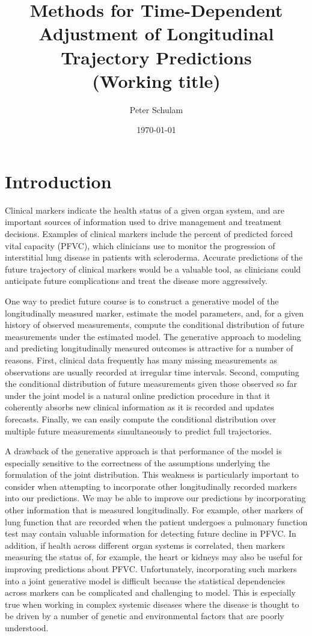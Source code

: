 \documentclass[12pt]{article}
\title{Methods for Time-Dependent Adjustment of Longitudinal Trajectory Predictions\\(Working title)}
\author{Peter Schulam}
\date{\today}
\begin{document}
\maketitle

\section{Introduction}

Clinical markers indicate the health status of a given organ system, and are important sources of information used to drive management and treatment decisions. Examples of clinical markers include the percent of predicted forced vital capacity (PFVC), which clinicians use to monitor the progression of interstitial lung disease in patients with scleroderma. Accurate predictions of the future trajectory of clinical markers would be a valuable tool, as clinicians could anticipate future complications and treat the disease more aggressively.

One way to predict future course is to construct a generative model of the longitudinally measured marker, estimate the model parameters, and, for a given history of observed measurements, compute the conditional distribution of future measurements under the estimated model. The generative approach to modeling and predicting longitudinally measured outcomes is attractive for a number of reasons. First, clinical data frequently has many missing measurements as observations are usually recorded at irregular time intervals. Second, computing the conditional distribution of future measurements given those observed so far under the joint model is a natural online prediction procedure in that it coherently absorbs new clinical information as it is recorded and updates forecasts. Finally, we can easily compute the conditional distribution over multiple future measurements simultaneously to predict full trajectories.

A drawback of the generative approach is that performance of the model is especially sensitive to the correctness of the assumptions underlying the formulation of the joint distribution. This weakness is particularly important to consider when attempting to incorporate other longitudinally recorded markers into our predictions. We may be able to improve our predictions by incorporating other information that is measured longitudinally. For example, other markers of lung function that are recorded when the patient undergoes a pulmonary function test may contain valuable information for detecting future decline in PFVC. In addition, if health across different organ systems is correlated, then markers measuring the status of, for example, the heart or kidneys may also be useful for improving predictions about PFVC. Unfortunately, incorporating such markers into a joint generative model is difficult because the statistical dependencies across markers can be complicated and challenging to model. This is especially true when working in complex systemic diseases where the disease is thought to be driven by a number of genetic and environmental factors that are poorly understood.
\end{document}
